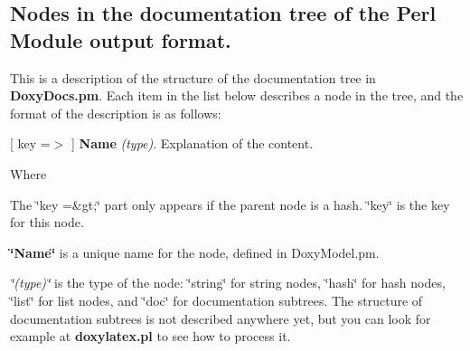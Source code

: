 \subsection*{Nodes in the documentation tree of the Perl Module output format.}

This is a description of the structure of the documentation tree in {\bfseries DoxyDocs.pm}. Each item in the list below describes a node in the tree, and the format of the description is as follows:


\begin{DoxyItemize}
\item \mbox{[} key =$>$ \mbox{]} {\bfseries Name} {\itshape (type)\/}. Explanation of the content. 
\end{DoxyItemize}

Where


\begin{DoxyItemize}
\item The \char`\"{}key =\&gt;\char`\"{} part only appears if the parent node is a hash. \char`\"{}key\char`\"{} is the key for this node.


\item {\bfseries \char`\"{}Name\char`\"{}} is a unique name for the node, defined in DoxyModel.pm.


\item {\itshape \char`\"{}(type)\char`\"{}\/} is the type of the node: \char`\"{}string\char`\"{} for string nodes, \char`\"{}hash\char`\"{} for hash nodes, \char`\"{}list\char`\"{} for list nodes, and \char`\"{}doc\char`\"{} for documentation subtrees. The structure of documentation subtrees is not described anywhere yet, but you can look for example at {\bfseries doxylatex.pl} to see how to process it.


\end{DoxyItemize}

